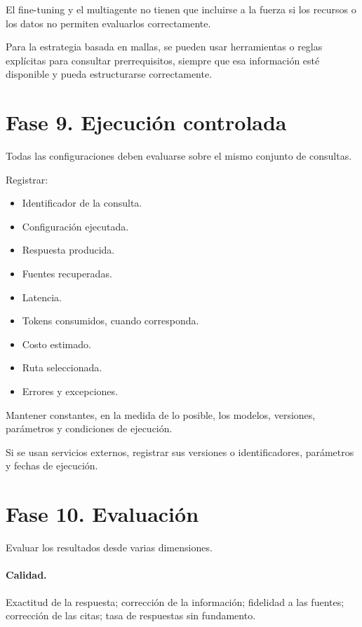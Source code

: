\documentclass[11pt,a4paper]{article}
\begin{document}
El fine-tuning y el multiagente no tienen que incluirse a la fuerza si los recursos o los datos no permiten evaluarlos correctamente.

Para la estrategia basada en mallas, se pueden usar herramientas o reglas explícitas para consultar prerrequisitos, siempre que esa información esté disponible y pueda estructurarse correctamente.

\section{Fase 9. Ejecución controlada}

Todas las configuraciones deben evaluarse sobre el mismo conjunto de consultas.

Registrar:

\begin{itemize}
  \item Identificador de la consulta.
  \item Configuración ejecutada.
  \item Respuesta producida.
  \item Fuentes recuperadas.
  \item Latencia.
  \item Tokens consumidos, cuando corresponda.
  \item Costo estimado.
  \item Ruta seleccionada.
  \item Errores y excepciones.
\end{itemize}

Mantener constantes, en la medida de lo posible, los modelos, versiones, parámetros y condiciones de ejecución.

Si se usan servicios externos, registrar sus versiones o identificadores, parámetros y fechas de ejecución.

\section{Fase 10. Evaluación}

Evaluar los resultados desde varias dimensiones.

\paragraph{Calidad.}
Exactitud de la respuesta; corrección de la información; fidelidad a las fuentes; corrección de las citas; tasa de respuestas sin fundamento.
\end{document}
